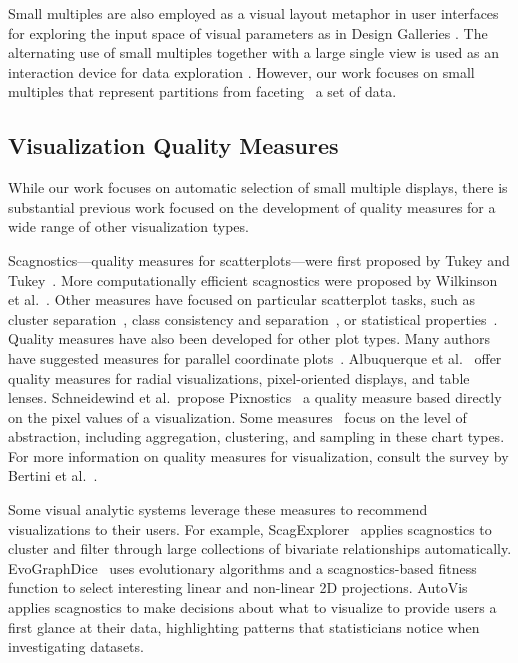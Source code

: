 
Small multiples are also employed as a visual layout metaphor in user interfaces for exploring the input space of visual parameters as in Design Galleries \cite{marks1997}. The alternating use of small multiples together with a large single view is used as an interaction device for data exploration \cite{van2013}. However, our work focuses on small multiples that represent partitions from faceting~\cite{Wilkinson2005GG} a set of data.

\subsection{Visualization Quality Measures}
While our work focuses on automatic selection of small multiple displays, there is substantial previous work focused on the development of quality measures for a wide range of other visualization types. 

Scagnostics---quality measures for scatterplots---were first proposed by Tukey and Tukey~\cite{Tukey1982, Tukey1985}. More computationally efficient scagnostics were proposed by Wilkinson et al.~\cite{Wilkinson2005, Wilkinson2008}. Other measures have focused on particular scatterplot tasks, such as cluster separation~\cite{Sedlmair2012, Tatu2009}, class consistency and separation~\cite{Sips2009, Schafer2013}, or statistical properties~\cite{Kandel2012, Seo2005, Piringer2008}.
Quality measures have also been developed for other plot types. Many authors have suggested measures for parallel coordinate plots~\cite{Ankerst1998, Dasgupta2010, Johansson2009, Yang2003}. Albuquerque et al.~\cite{Albuquerque2010} offer quality measures for radial visualizations, pixel-oriented displays, and table lenses. Schneidewind et al.\ propose Pixnostics~\cite{Schneidewind2006} a quality measure based directly on the pixel values of a visualization. Some measures~\cite{Bertini2006, Cui2006, Yang2003} focus on the level of abstraction, including aggregation, clustering, and sampling in these chart types. For more information on quality measures for visualization, consult the survey by Bertini et al.~\cite{Bertini2011}. 

Some visual analytic systems leverage these measures to recommend visualizations to their users. For example, ScagExplorer~\cite{Dang2014} applies scagnostics to cluster and filter through large collections of bivariate relationships automatically.
EvoGraphDice~\cite{Boukhelifa2013} uses evolutionary algorithms and a scagnostics-based fitness function to select interesting linear and non-linear 2D projections.
AutoVis~\cite{Wills2010} applies scagnostics to make decisions about what to visualize to provide users a first glance at their data, highlighting patterns that statisticians notice when investigating datasets.

